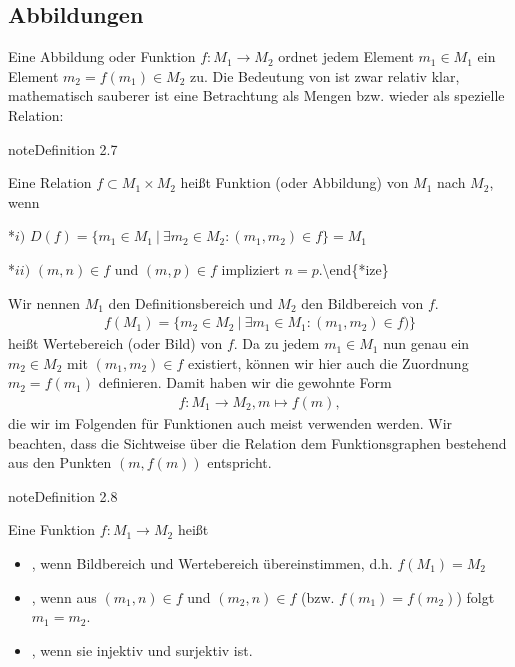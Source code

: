 \documentclass[letterpaper,10pt,english]{jupyterBook}
\begin{document}
\subsection{Abbildungen}
\label{\detokenize{grundlagen/mengenlogik:abbildungen}}
Eine Abbildung oder Funktion \(f:M_1 \rightarrow M_2\) ordnet jedem Element \(m_1 \in M_1\) ein Element \(m_2 =f(m_1) \in M_2\) zu.
Die Bedeutung von  ist zwar relativ klar, mathematisch sauberer  ist eine Betrachtung als Mengen bzw. wieder als spezielle Relation:
\label{grundlagen/mengenlogik:definition-10}
\begin{sphinxadmonition}{note}{Definition 2.7}



Eine Relation \(f \subset M_1 \times M_2\) heißt Funktion (oder Abbildung) von \(M_1\) nach \(M_2\), wenn

*\(i)\) \(D(f) = \{m_1 \in M_1~|~\exists m_2 \in M_2: (m_1,m_2) \in f \} = M_1 \)

*\(ii)\) \((m,n) \in f\) und \((m,p) \in f\) impliziert \(n=p\).\textbackslash{}end\{*ize\}
\end{sphinxadmonition}

Wir nennen \(M_1\) den Definitionsbereich und \(M_2\) den Bildbereich von \(f\).
\begin{equation*}
\begin{split}f(M_1) = \{m_2 \in M_2~|~\exists m_1 \in M_1: (m_1,m_2) \in f)\}\end{split}
\end{equation*}
heißt Wertebereich (oder Bild) von \(f\).
Da zu jedem \(m_1 \in M_1\) nun genau ein \(m_2 \in M_2\) mit \((m_1,m_2) \in f\) existiert, können wir hier auch die Zuordnung \(m_2=f(m_1)\) definieren. Damit haben wir die gewohnte Form
\begin{equation*}
\begin{split}f: M_1 \rightarrow M_2, m \mapsto f(m),\end{split}
\end{equation*}
die wir im Folgenden für Funktionen auch meist verwenden werden. Wir beachten, dass die Sichtweise über die Relation dem Funktionsgraphen bestehend aus den Punkten \((m,f(m))\) entspricht.
\label{grundlagen/mengenlogik:definition-11}
\begin{sphinxadmonition}{note}{Definition 2.8}



Eine Funktion \(f:M_1 \rightarrow M_2\) heißt
\begin{itemize}
\item {} 
, wenn Bildbereich und Wertebereich übereinstimmen, d.h. \(f(M_1)=M_2\)

\item {} 
, wenn aus \((m_1,n) \in f\) und \((m_2,n) \in f\) (bzw. \(f(m_1) =f(m_2)\)) folgt \(m_1=m_2\).

\item {} 
, wenn sie injektiv und surjektiv ist.

\end{itemize}
\end{sphinxadmonition}
\end{document}
